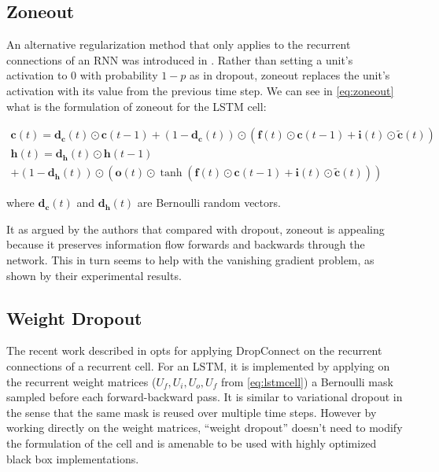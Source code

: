 \subsection{Zoneout}

An alternative regularization method that only applies to the recurrent connections of an RNN was introduced in \cite{krueger2016zoneout}. Rather than setting a unit's activation to 0 with probability $1-p$ as in dropout, zoneout replaces the unit's activation with its value from the previous time step. We can see in \autoref{eq:zoneout} what is the formulation of zoneout for the LSTM cell:

\begin{equation} \label{eq:zoneout}
	\begin{gathered}
		\mathbf{c}(t) = \mathbf{d_c}(t)\odot\mathbf{c}(t-1) + (1-\mathbf{d_c}(t))\odot(\mathbf{f}(t) \odot \mathbf{c}(t-1) + \mathbf{i}(t) \odot \mathbf{\tilde{c}}(t)) \\
		\mathbf{h}(t) = \mathbf{d_h}(t)\odot\mathbf{h}(t-1) \\ 
		+ (1-\mathbf{d_h}(t))\odot (\mathbf{o}(t) \odot \tanh(\mathbf{f}(t) \odot \mathbf{c}(t-1) + \mathbf{i}(t) \odot \mathbf{\tilde{c}}(t)))
	\end{gathered}
\end{equation}

where $\mathbf{d_c}(t)$ and $\mathbf{d_h}(t)$ are Bernoulli random vectors.

It as argued by the authors that compared with dropout, zoneout is appealing because it preserves information flow forwards and backwards through the network. This in turn seems to help with the vanishing gradient problem, as shown by their experimental results.

\subsection{Weight Dropout}

The recent work described in \cite{merity2017regularizing} opts for applying DropConnect \cite{wan2013regularization} on the recurrent connections of a recurrent cell. For an LSTM, it is implemented by applying on the recurrent weight matrices ($U_f,U_i,U_o,U_f$ from \autoref{eq:lstmcell}) a Bernoulli mask  sampled before each forward-backward pass. It is similar to variational dropout in the sense that the same mask is reused over multiple time steps. However by working directly on the weight matrices, ``weight dropout'' doesn't need to modify the formulation of the cell and is amenable to be used with highly optimized black box implementations.